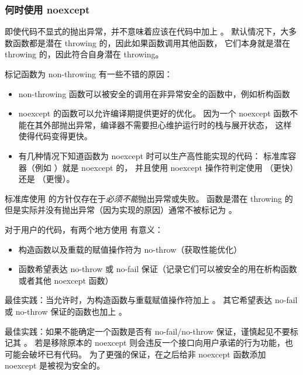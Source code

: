 \documentclass[../../LearnCpp.tex]{subfiles}
\begin{document}
\subsubsection*{何时使用 noexcept}

即使代码不显式的抛出异常，并不意味着应该在代码中加上 。
默认情况下，大多数函数都是潜在 throwing 的，因此如果函数调用其他函数，
它们本身就是潜在 throwing 的，因此符合自身潜在 throwing。

标记函数为 non-throwing 有一些不错的原因：

\begin{itemize}
  \item non-throwing 函数可以被安全的调用在非异常安全的函数中，例如析构函数
  \item noexcept 的函数可以允许编译期提供更好的优化。
        因为一个 noexcept 函数不能在其外部抛出异常，编译器不需要担心维护运行时的栈与展开状态，
        这样使得代码变得更快。
  \item 有几种情况下知道函数为 noexcept 时可以生产高性能实现的代码：
        标准库容器（例如 ）就是 noexcept 的，
        并且使用 noexcept 操作符判定使用 （更快）还是 （更慢）。
\end{itemize}

标准库使用  的方针仅存在于\textit{必须不能}抛出异常或失败。
函数是潜在 throwing 的但是实际并没有抛出异常（因为实现的原因）通常不被标记为 。

对于用户的代码，有两个地方使用  有意义：

\begin{itemize}
  \item 构造函数以及重载的赋值操作符为 no-throw（获取性能优化）
  \item 函数希望表达 no-throw 或 no-fail 保证（记录它们可以被安全的用在析构函数或者其他 noexcept 函数）
\end{itemize}

最佳实践：当允许时，为构造函数与重载赋值操作符加上 。
其它希望表达 no-fail 或 no-throw 保证的函数也加上 。

最佳实践：如果不能确定一个函数是否有 no-fail/no-throw 保证，谨慎起见不要标记其 。
若是移除原本的 noexcept 则会违反一个接口向用户承诺的行为功能，也可能会破坏已有代码。
为了更强的保证，在之后给非 noexcept 函数添加 noexcept 是被视为安全的。
\end{document}
